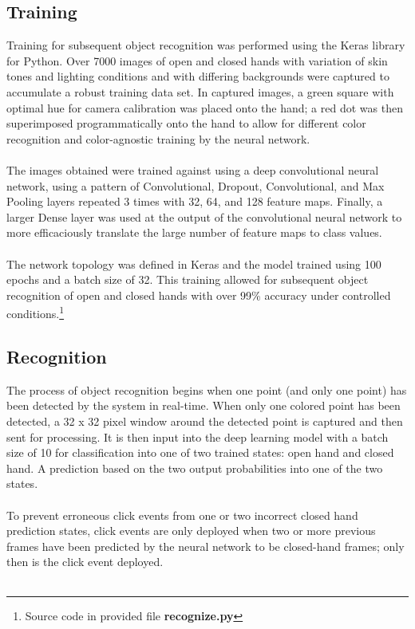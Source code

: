 \documentclass[twoside,twocolumn]{article}
\begin{document}
\subsection{Training}
Training for subsequent object recognition was performed using the Keras library for Python. Over 7000 images of open and closed hands with variation of skin tones and lighting conditions and with differing backgrounds were captured to accumulate a robust training data set. In captured images, a green square with optimal hue for camera calibration was placed onto the hand; a red dot was then superimposed programmatically onto the hand to allow for different color recognition and color-agnostic training by the neural network. \\ \\
The images obtained were trained against using a deep convolutional neural network, using a pattern of Convolutional, Dropout, Convolutional, and Max Pooling layers repeated 3 times with 32, 64, and 128 feature maps. Finally, a larger Dense layer was used at the output of the convolutional neural network to more efficaciously translate the large number of feature maps to class values. \\ \\
The network topology was defined in Keras and the model trained using 100 epochs and a batch size of 32. This training allowed for subsequent object recognition of open and closed hands with over 99\% accuracy under controlled conditions.\footnote{Source code in provided file \textbf{recognize.py}}

\subsection{Recognition}
The process of object recognition begins when one point (and only one point) has been detected by the system in real-time. When only one colored point has been detected, a 32 x 32 pixel window around the detected point is captured and then sent for processing. It is then input into the deep learning model with a batch size of 10 for classification into one of two trained states: open hand and closed hand. A prediction based on the two output probabilities into one of the two states. \\ \\ To prevent erroneous click events from one or two incorrect closed hand prediction states, click events are only deployed when two or more previous frames have been predicted by the neural network to be closed-hand frames; only then is the click event deployed. \\ \\
\end{document}
